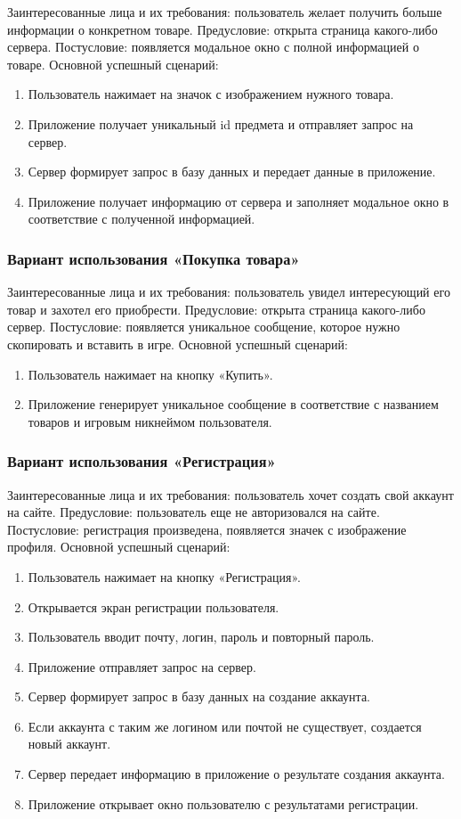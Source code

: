 Заинтересованные лица и их требования: пользователь желает получить больше информации о конкретном товаре.
Предусловие: открыта страница какого-либо сервера.
Постусловие: появляется модальное окно с полной информацией о товаре.
Основной успешный сценарий:
\begin{enumerate}
	\item Пользователь нажимает на значок с изображением нужного товара.
	\item Приложение получает уникальный id предмета и отправляет запрос на сервер.
	\item Сервер формирует запрос в базу данных и передает данные в приложение.
	\item Приложение получает информацию от сервера и заполняет модальное окно в соответствие с полученной информацией.
\end{enumerate}

\subsubsection{Вариант использования «Покупка товара»}

Заинтересованные лица и их требования: пользователь увидел интересующий его товар и захотел его приобрести.
Предусловие: открыта страница какого-либо сервер.
Постусловие: появляется уникальное сообщение, которое нужно скопировать и вставить в игре.
Основной успешный сценарий:
\begin{enumerate}
	\item Пользователь нажимает на кнопку «Купить».
	\item Приложение генерирует уникальное сообщение в соответствие с названием товаров и игровым никнеймом пользователя.
\end{enumerate}

\subsubsection{Вариант использования «Регистрация»}

Заинтересованные лица и их требования: пользователь хочет создать свой аккаунт на сайте.
Предусловие: пользователь еще не авторизовался на сайте.
Постусловие: регистрация произведена, появляется значек с изображение профиля.
Основной успешный сценарий:
\begin{enumerate}
	\item Пользователь нажимает на кнопку «Регистрация».
	\item Открывается экран регистрации пользователя.
	\item Пользователь вводит почту, логин, пароль и повторный пароль.
	\item Приложение отправляет запрос на сервер.
	\item Сервер формирует запрос в базу данных на создание аккаунта.
	\item Если аккаунта с таким же логином или почтой не существует, создается новый аккаунт.
	\item Сервер передает информацию в приложение о результате создания аккаунта.
	\item Приложение открывает окно пользователю с результатами регистрации.
\end{enumerate}

